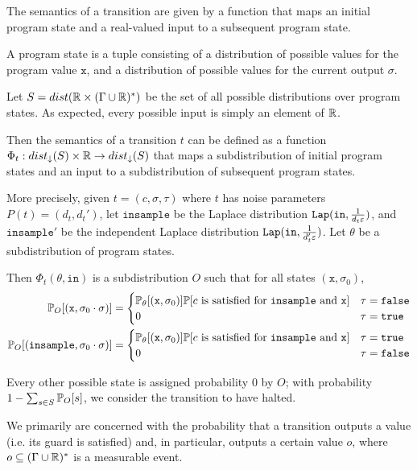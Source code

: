 The semantics of a transition are given by a function that maps an initial program state and a real-valued input to a subsequent program state. 

A program state is a tuple consisting of a distribution of possible values for the program value $\texttt{x}$, and a distribution of possible values for the current output $\sigma$. 

Let $S = dist(\mathbb{R}\times (\Gamma \cup \mathbb{R})^*)$ be the set of all possible distributions over program states. 
As expected, every possible input is simply an element of $\mathbb{R}$.

Then the semantics of a transition $t$ can be defined as a function $\Phi_t:dist_\downarrow(S)\times \mathbb{R} \to dist_\downarrow (S)$ that maps a subdistribution of initial program states and an input to a subdistribution of subsequent program states. 

More precisely, given $t = (c, \sigma, \tau)$ where $t$ has noise parameters $P(t) = (d_t, d_t')$, let $\texttt{insample}$ be the Laplace distribution $\texttt{Lap}(\texttt{in}, \frac{1}{d_t\varepsilon})$, and $\texttt{insample}'$ be the independent Laplace distribution $\texttt{Lap}(\texttt{in}, \frac{1}{d_t'\varepsilon})$. Let $\theta$ be a subdistribution of program states. 

Then $\Phi_t(\theta, \texttt{in})$ is a subdistribution $O$ such that for all states $(\texttt{x}, \sigma_0)$, \begin{align*}
   \mathbb{P}_O[(\texttt{x}, \sigma_0\cdot \sigma)]&= \begin{cases}
    \mathbb{P}_\theta[(\texttt{x}, \sigma_0)]\mathbb{P}[c \text{ is satisfied for }\texttt{insample}\text{ and }\texttt{x}]& \tau = \texttt{false}\\
    0 & \tau = \texttt{true}
  \end{cases} \\
  \mathbb{P}_O[(\texttt{insample}, \sigma_0\cdot \sigma)]&= \begin{cases}
    \mathbb{P}_\theta[(\texttt{x}, \sigma_0)]\mathbb{P}[c \text{ is satisfied for }\texttt{insample}\text{ and }\texttt{x}]& \tau = \texttt{true}\\
    0 & \tau = \texttt{false}
  \end{cases} 
\end{align*}

Every other possible state is assigned probability 0 by $O$; with probability $1-\sum_{s\in S} \mathbb{P}_O[s]$, we consider the transition to have halted.

We primarily are concerned with the probability that a transition outputs a value (i.e. its guard is satisfied) and, in particular, outputs a certain value $o$, where $o\subseteq (\Gamma\cup\mathbb{R})^*$ is a measurable event.


